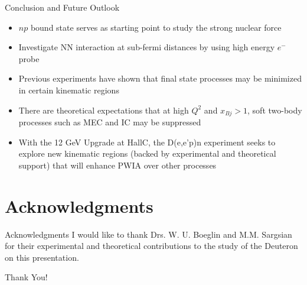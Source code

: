 \documentclass{beamer}
\begin{document}
\begin{frame}{Conclusion and Future Outlook}
\begin{footnotesize}
\begin{itemize}
\item $np$ bound state serves as starting point to study the strong nuclear force
\vspace{0.5cm}
\item Investigate NN interaction at sub-fermi distances by using high energy $e^{-}$ probe
\vspace{0.5cm}
\item Previous experiments have shown that final state processes may be minimized in certain kinematic regions
\vspace{0.5cm}
\item There are theoretical expectations that at high $Q^{2}$ and $x_{Bj}>1$, soft two-body processes such as MEC and IC may be suppressed
\vspace{0.5cm}
\item With the 12 GeV Upgrade at HallC, the D(e,e'p)n experiment seeks to explore new kinematic regions (backed by experimental and theoretical support)  
that will enhance PWIA over other processes 
\end{itemize}
\end{footnotesize}
\end{frame}

\section{Acknowledgments}

\begin{frame}{Acknowledgments}
I would like to thank Drs. W. U. Boeglin and M.M. Sargsian for their experimental and theoretical contributions to the study of the Deuteron on this
presentation. \\
\vspace{2cm}
\begin{Huge}
\centerline{Thank You!}
\end{Huge}
\end{frame}
\end{document}
